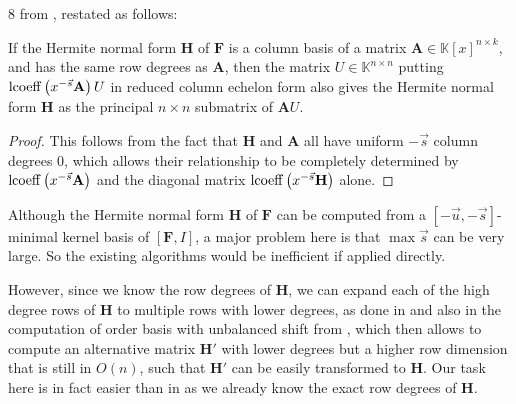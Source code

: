8 from \citep{GS2011}, restated as follows:
\begin{lem}
\label{lem:recoverH}If the Hermite normal form $\mathbf{H}$ of $\mathbf{F}$
is a column basis of a matrix $\mathbf{A}\in\mathbb{K}\left[x\right]^{n\times k}$,
and has the same row degrees as $\mathbf{A}$, then the matrix $U\in\mathbb{K}^{n\times n}$
putting $\operatorname{lcoeff}\left(x^{-\vec{s}}\mathbf{A}\right)U$ in reduced
column echelon form also gives the Hermite normal form $\mathbf{H}$
as the principal $n\times n$ submatrix of $\mathbf{A}U$.\end{lem}
\begin{proof}
This follows from the fact that $\mathbf{H}$ and $\mathbf{A}$ all
have uniform $-\vec{s}$ column degrees 0, which allows their relationship
to be completely determined by $\operatorname{lcoeff}\left(x^{-\vec{s}}\mathbf{A}\right)$
and the diagonal matrix $\operatorname{lcoeff}\left(x^{-\vec{s}}\mathbf{H}\right)$
alone.
\end{proof}
Although the Hermite normal form $\mathbf{H}$ of $\mathbf{F}$ can
be computed from a $\left[-\vec{u},-\vec{s}\right]$-minimal kernel
basis of $\left[\mathbf{F},I\right]$, a major problem here is that
$\max\vec{s}$ can be very large. So the existing algorithms would
be inefficient if applied directly. 

However, since we know the row degrees of $\mathbf{H}$, we can expand
each of the high degree rows of $\mathbf{H}$ to multiple rows with
lower degrees, as done in \citep{GS2011,G2011} and also in the computation
of order basis with unbalanced shift from ,
which then allows to compute an alternative matrix $\mathbf{H}'$
with lower degrees but a higher row dimension that is still in $O(n)$,
such that $\mathbf{H}'$ can be easily transformed to $\mathbf{H}$.
Our task here is in fact easier than in 
as we already know the exact row degrees of $\mathbf{H}$.

